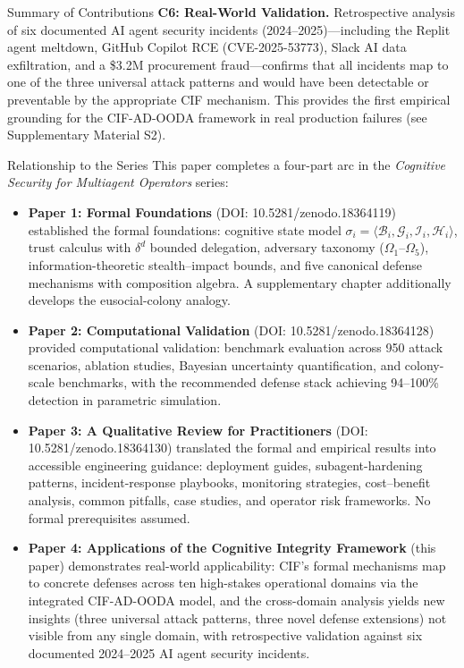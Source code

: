 \documentclass[
  ignorenonframetext,
]{beamer}
\providecommand{\tightlist}{%
  \setlength{\itemsep}{0pt}\setlength{\parskip}{0pt}}
\begin{document}
\begin{frame}[allowframebreaks]{Summary of Contributions}
\textbf{C6: Real-World Validation.} Retrospective analysis of six
documented AI agent security incidents (2024--2025)---including the
Replit agent meltdown, GitHub Copilot RCE (CVE-2025-53773), Slack AI
data exfiltration, and a \$3.2M procurement fraud---confirms that all
incidents map to one of the three universal attack patterns and would
have been detectable or preventable by the appropriate CIF mechanism.
This provides the first empirical grounding for the CIF-AD-OODA
framework in real production failures (see Supplementary Material S2).
\end{frame}

\begin{frame}[allowframebreaks]{Relationship to the Series}
\protect{}\label{relationship-to-the-series}
This paper completes a four-part arc in the \emph{Cognitive Security for
Multiagent Operators} series:

\begin{itemize}
\tightlist
\item
  \textbf{Paper 1: Formal Foundations} \cite{friedman2026cogsec1} (DOI:
  10.5281/zenodo.18364119) established the formal foundations: cognitive
  state model
  \(\sigma_i = \langle \mathcal{B}_i, \mathcal{G}_i, \mathcal{I}_i, \mathcal{H}_i \rangle\),
  trust calculus with \(\delta^d\) bounded delegation, adversary
  taxonomy (\(\Omega_1\)--\(\Omega_5\)), information-theoretic
  stealth--impact bounds, and five canonical defense mechanisms with
  composition algebra. A supplementary chapter additionally develops the
  eusocial-colony analogy.
\item
  \textbf{Paper 2: Computational Validation} \cite{friedman2026cogsec2}
  (DOI: 10.5281/zenodo.18364128) provided computational validation:
  benchmark evaluation across 950 attack scenarios, ablation studies,
  Bayesian uncertainty quantification, and colony-scale benchmarks, with
  the recommended defense stack achieving 94--100\% detection in
  parametric simulation.
\item
  \textbf{Paper 3: A Qualitative Review for Practitioners}
  \cite{friedman2026cogsec3} (DOI: 10.5281/zenodo.18364130) translated
  the formal and empirical results into accessible engineering guidance:
  deployment guides, subagent-hardening patterns, incident-response
  playbooks, monitoring strategies, cost--benefit analysis, common
  pitfalls, case studies, and operator risk frameworks. No formal
  prerequisites assumed.
\item
  \textbf{Paper 4: Applications of the Cognitive Integrity Framework}
  (this paper) demonstrates real-world applicability: CIF's formal
  mechanisms map to concrete defenses across ten high-stakes operational
  domains via the integrated CIF-AD-OODA model, and the cross-domain
  analysis yields new insights (three universal attack patterns, three
  novel defense extensions) not visible from any single domain, with
  retrospective validation against six documented 2024--2025 AI agent
  security incidents.
\end{itemize}


\end{frame}
\end{document}
